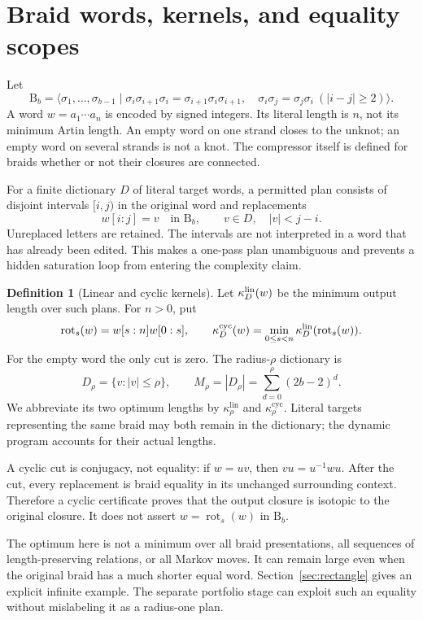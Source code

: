 \documentclass[11pt,a4paper]{article}
\theoremstyle{definition}\newtheorem{definition}[theorem]{Definition}
\theoremstyle{remark}\newtheorem{remark}[theorem]{Remark}
\newcommand{\B}{\mathrm B}
\newcommand{\rot}{\operatorname{rot}}
\newcommand{\kc}[1]{\kappa^{\mathrm{cyc}}_{#1}}
\newcommand{\kl}[1]{\kappa^{\mathrm{lin}}_{#1}}
\begin{document}
\section{Braid words, kernels, and equality scopes}

Let
\[
 \B_b=\langle \sigma_1,\ldots,\sigma_{b-1}\mid
 \sigma_i\sigma_{i+1}\sigma_i=\sigma_{i+1}\sigma_i\sigma_{i+1},\quad
 \sigma_i\sigma_j=\sigma_j\sigma_i\ (|i-j|\ge2)\rangle.
\]
A word $w=a_1\cdots a_n$ is encoded by signed integers. Its literal length is
$n$, not its minimum Artin length. An empty word on one strand closes to the
unknot; an empty word on several strands is not a knot. The compressor itself
is defined for braids whether or not their closures are connected.

For a finite dictionary $D$ of literal target words, a permitted plan consists
of disjoint intervals $[i,j)$ in the original word and replacements
\[
 w[i:j]=v\quad\text{in }\B_b,\qquad v\in D,\quad |v|<j-i.
\]
Unreplaced letters are retained. The intervals are not interpreted in a word
that has already been edited. This makes a one-pass plan unambiguous and
prevents a hidden saturation loop from entering the complexity claim.

\begin{definition}[Linear and cyclic kernels]
Let $\kappa_D^{\rm lin}(w)$ be the minimum output length over such plans.
For $n>0$, put
\[
 \rot_s(w)=w[s:n]w[0:s],\qquad
 \kappa_D^{\rm cyc}(w)=\min_{0\le s<n}\kappa_D^{\rm lin}(\rot_s(w)).
\]
For the empty word the only cut is zero. The radius-$\rho$ dictionary is
\[
 D_\rho=\{v: |v|\le\rho\},\qquad
 M_\rho=|D_\rho|=\sum_{d=0}^{\rho}(2b-2)^d.
\]
We abbreviate its two optimum lengths by $\kl{\rho}$ and $\kc{\rho}$.
Literal targets representing the same braid may both remain in the dictionary;
the dynamic program accounts for their actual lengths.
\end{definition}

A cyclic cut is conjugacy, not equality: if $w=uv$, then
$vu=u^{-1}wu$. After the cut, every replacement is braid equality in its
unchanged surrounding context. Therefore a cyclic certificate proves that
the output closure is isotopic to the original closure. It does not assert
$w=\rot_s(w)$ in $\B_b$.

The optimum here is not a minimum over all braid presentations, all sequences
of length-preserving relations, or all Markov moves. It can remain large even
when the original braid has a much shorter equal word. Section~\ref{sec:rectangle}
gives an explicit infinite example. The separate portfolio stage can exploit
such an equality without mislabeling it as a radius-one plan.
\end{document}
